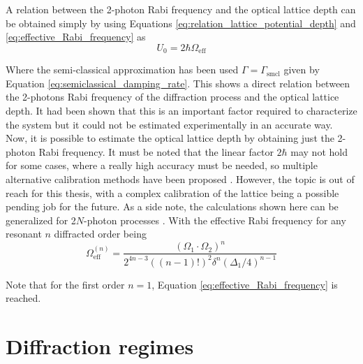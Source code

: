 A relation between the 2-photon Rabi frequency and the optical lattice depth can be obtained simply by using Equations \eqref{eq:relation_lattice_potential_depth} and \eqref{eq:effective_Rabi_frequency} as \cite{Ovchinnikov1999}
\begin{equation}
	U_0 = 2\hbar\Omega_\text{eff}
\end{equation}

Where the semi-classical approximation has been used $\Gamma=\Gamma_\text{smcl}$ given by Equation \eqref{eq:semiclassical_damping_rate}. This shows a direct relation between the 2-photons Rabi frequency of the diffraction process and the optical lattice depth. It had been shown that this is an important factor required to characterize the system but it could not be estimated experimentally in an accurate way. Now, it is possible to estimate the optical lattice depth by obtaining just the 2-photon Rabi frequency. It must be noted that the linear factor $2\hbar$ may not hold for some cases, where a really high accuracy must be needed, so multiple alternative calibration methods have been proposed \cite{Ovchinnikov1999,Cabrera2018, Friebel1998,Cristiani2002}. However, the topic is out of reach for this thesis, with a complex calibration of the lattice being a possible pending job for the future. As a side note, the calculations shown here can be generalized for 2$N$-photon processes \cite{Giltner1995}. With the effective Rabi frequency for any resonant $n$ diffracted order being
\begin{equation}
	\Omega_\text{eff}^{(n)} = \frac{(\Omega_1 \cdot \Omega_2)^n}{2^{4n-3}((n-1)!)^2\delta^n(\Delta_1/4)^{n-1}}
\end{equation}

Note that for the first order $n=1$, Equation \eqref{eq:effective_Rabi_frequency} is reached.

\section{Diffraction regimes}



